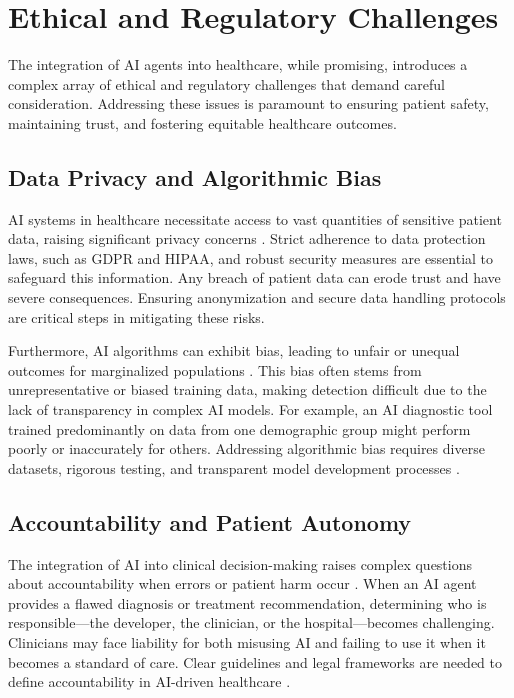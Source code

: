 \documentclass[12pt,a4paper]{article}
\begin{document}
\section{Ethical and Regulatory Challenges}
\label{sec:ethical_regulatory}
The integration of AI agents into healthcare, while promising, introduces a complex array of ethical and regulatory challenges that demand careful consideration. Addressing these issues is paramount to ensuring patient safety, maintaining trust, and fostering equitable healthcare outcomes.

\subsection{Data Privacy and Algorithmic Bias}
\label{sec:data_privacy_bias}
AI systems in healthcare necessitate access to vast quantities of sensitive patient data, raising significant privacy concerns \cite{nih_ethical_implications}. Strict adherence to data protection laws, such as GDPR and HIPAA, and robust security measures are essential to safeguard this information. Any breach of patient data can erode trust and have severe consequences. Ensuring anonymization and secure data handling protocols are critical steps in mitigating these risks.

Furthermore, AI algorithms can exhibit bias, leading to unfair or unequal outcomes for marginalized populations \cite{nih_ethical_implications}. This bias often stems from unrepresentative or biased training data, making detection difficult due to the lack of transparency in complex AI models. For example, an AI diagnostic tool trained predominantly on data from one demographic group might perform poorly or inaccurately for others. Addressing algorithmic bias requires diverse datasets, rigorous testing, and transparent model development processes \cite{who2021ai}.

\subsection{Accountability and Patient Autonomy}
\label{sec:accountability_autonomy}
The integration of AI into clinical decision-making raises complex questions about accountability when errors or patient harm occur \cite{nih_ethical_implications}. When an AI agent provides a flawed diagnosis or treatment recommendation, determining who is responsible—the developer, the clinician, or the hospital—becomes challenging. Clinicians may face liability for both misusing AI and failing to use it when it becomes a standard of care. Clear guidelines and legal frameworks are needed to define accountability in AI-driven healthcare \cite{fda_ai_ml_samd}.
\end{document}
